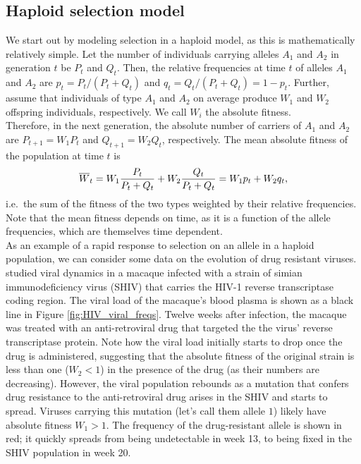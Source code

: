 \subsection{Haploid selection model}
We start out by modeling selection in a haploid model, as this is mathematically relatively simple.
Let the number of individuals carrying alleles $A_1$ and $A_2$ in generation $t$ be $P_t$ and $Q_t$. Then, the relative frequencies at time $t$ of alleles $A_1$ and $A_2$ are $p_t = P_t / (P_t + Q_t)$ and $q_t = Q_t / (P_t + Q_t) = 1 - p_t$. Further, assume that individuals of type $A_1$ and $A_2$ on average produce $W_1$ and $W_2$ offspring individuals, respectively. We call $W_i$ the absolute fitness.\\

Therefore, in the next generation, the absolute number of carriers of $A_1$ and $A_2$ are $P_{t+1} = W_1 P_t$ and $Q_{t+1} = W_2 Q_t$, respectively. The mean absolute fitness of the population at time $t$ is
\begin{equation}
	\label{eq:meanAbsFit}
	\overline{W}_t = W_1 \frac{P_t}{P_t + Q_t} + W_2 \frac{Q_t}{P_t + Q_t} = W_1 p_t + W_2 q_t,	
\end{equation}
i.e.\ the sum of the fitness of the two types weighted by their
relative frequencies. Note that the mean fitness depends on time, as
it is a function of the allele frequencies, which are themselves time
dependent. \\

As an example of a rapid response to selection on an allele in a haploid population, we can consider some data on the evolution of drug resistant viruses. \citet{feder2017} studied viral dynamics in a macaque infected with a strain of simian immunodeficiency virus (SHIV) that carries the HIV-1 reverse transcriptase coding region.  The viral load of the macaque's blood plasma is shown as a black line in Figure \ref{fig:HIV_viral_freqs}. Twelve weeks after infection, the macaque was treated with an anti-retroviral drug that targeted the the virus' reverse transcriptase protein. Note how the viral load initially starts to drop once the drug is administered, suggesting that the absolute fitness of the original strain is less than one ($W_{2}<1$) in the presence of the drug (as their numbers are decreasing). However, the viral population rebounds as a mutation  that confers drug resistance to the anti-retroviral drug arises in the SHIV and starts to spread. Viruses carrying this mutation (let's call them allele $1$) likely have absolute fitness $W_1>1$. The frequency of the drug-resistant allele is shown in red; it quickly spreads from being undetectable in week 13, to being fixed in the SHIV population in week 20.

